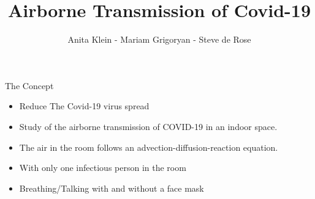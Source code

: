 \documentclass[10pt]{beamer}
\author{Anita Klein - Mariam Grigoryan - Steve de Rose}
\title{Airborne Transmission of Covid-19}
\newcommand{\PI}{}
\begin{document}
    
\begin{frame}

    \maketitle

\end{frame}


\section{\PI} 
\begin{frame}{The Concept}{\PI} 
    \begin{itemize}
        \item Reduce The Covid-19 virus spread
        \item Study of the airborne transmission of COVID-19 in an indoor space.
        \item The air in the room follows an advection-diffusion-reaction equation.
        \item With only one infectious person in the room
        \item Breathing/Talking with and without a face mask
    \end{itemize}  

\end{frame}
\end{document}
